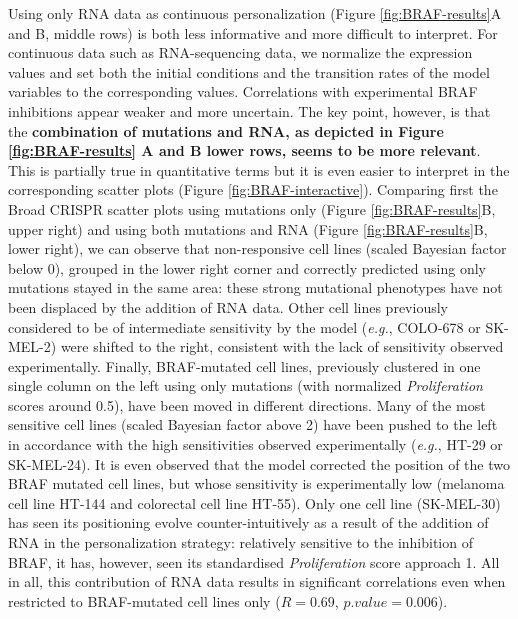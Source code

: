\documentclass[a4paper,12pt,twoside,onecolumn,openright,final,oldfontcommands]{memoir}
\begin{document}
Using only RNA data as continuous personalization (Figure
\ref{fig:BRAF-results}A and B, middle rows) is both less informative and
more difficult to interpret. For continuous data such as RNA-sequencing
data, we normalize the expression values and set both the initial
conditions and the transition rates of the model variables to the
corresponding values. Correlations with experimental BRAF inhibitions
appear weaker and more uncertain. The key point, however, is that the
\textbf{combination of mutations and RNA, as depicted in Figure
\ref{fig:BRAF-results} A and B lower rows, seems to be more relevant}.
This is partially true in quantitative terms but it is even easier to
interpret in the corresponding scatter plots (Figure
\ref{fig:BRAF-interactive}). Comparing first the Broad CRISPR scatter
plots using mutations only (Figure \ref{fig:BRAF-results}B, upper right)
and using both mutations and RNA (Figure \ref{fig:BRAF-results}B, lower
right), we can observe that non-responsive cell lines (scaled Bayesian
factor below 0), grouped in the lower right corner and correctly
predicted using only mutations stayed in the same area: these strong
mutational phenotypes have not been displaced by the addition of RNA
data. Other cell lines previously considered to be of intermediate
sensitivity by the model (\emph{e.g.}, COLO-678 or SK-MEL-2) were
shifted to the right, consistent with the lack of sensitivity observed
experimentally. Finally, BRAF-mutated cell lines, previously clustered
in one single column on the left using only mutations (with normalized
\emph{Proliferation} scores around 0.5), have been moved in different
directions. Many of the most sensitive cell lines (scaled Bayesian
factor above 2) have been pushed to the left in accordance with the high
sensitivities observed experimentally (\emph{e.g.}, HT-29 or SK-MEL-24).
It is even observed that the model corrected the position of the two
BRAF mutated cell lines, but whose sensitivity is experimentally low
(melanoma cell line HT-144 and colorectal cell line HT-55). Only one
cell line (SK-MEL-30) has seen its positioning evolve
counter-intuitively as a result of the addition of RNA in the
personalization strategy: relatively sensitive to the inhibition of
BRAF, it has, however, seen its standardised \emph{Proliferation} score
approach 1. All in all, this contribution of RNA data results in
significant correlations even when restricted to BRAF-mutated cell lines
only (\(R=0.69\), \(p.value=0.006\)).
\end{document}
